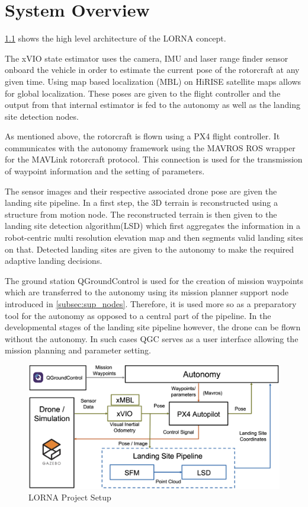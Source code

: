 \chapter{System Overview}

\cref{fig:lorna_setup} shows the high level architecture of the LORNA concept. 

The xVIO state estimator uses the camera, IMU and laser range finder sensor onboard the vehicle in order to estimate the current pose of the rotorcraft at any given time. Using map based localization (MBL) on HiRISE satellite maps allows for global localization. These poses are given to the flight controller and the output from that internal estimator is fed to the autonomy as well as the landing site detection nodes.

As mentioned above, the rotorcraft is flown using a PX4 flight controller. It communicates with the autonomy framework using the MAVROS ROS wrapper for the MAVLink rotorcraft protocol. This connection is used for the transmission of waypoint information and the setting of parameters.

The sensor images and their respective associated drone pose are given the landing site pipeline. In a first step, the 3D terrain is reconstructed using a structure from motion node. The reconstructed terrain is then given to the landing site detection algorithm(LSD) which first aggregates the information in a robot-centric multi resolution elevation map and then segments valid landing sites on that. Detected landing sites are given to the autonomy to make the required adaptive landing decisions.

The ground station QGroundControl is used for the creation of mission waypoints which are transferred to the autonomy using its mission planner support node introduced in \cref{subsec:sup_nodes}. Therefore, it is used more so as a preparatory tool for the autonomy as opposed to a central part of the pipeline. In the developmental stages of the landing site pipeline however, the drone can be flown without the autonomy. In such cases QGC serves as a user interface allowing the mission planning and parameter setting. 


\clearpage %

\begin{figure}[ht]
    \centering
    \includegraphics[scale=0.18]{images/system_overview/setup_flowchart_with_vio.png}
    \caption{LORNA Project Setup}
    \label{fig:lorna_setup}
\end{figure}

